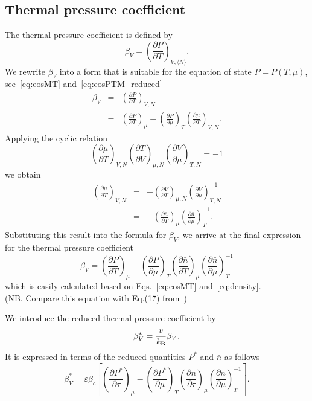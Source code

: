 \documentclass[12pt]{article}
\begin{document}
	\subsection{Thermal pressure coefficient}
	The thermal pressure coefficient is defined by
	\begin{equation}
		\label{def:therm_pres_coef}
		\beta_V = \left( \frac{\partial P}{\partial T} \right)_{V,\langle N \rangle}.
	\end{equation}
	We rewrite $\beta_V$ into a form that is suitable for the equation of state $P=P(T,\mu)$, see~\eqref{eq:eosMT} and~\eqref{eq:eosPTM_reduced}
	\begin{eqnarray}
		\beta_V & = & \left(\frac{\partial P}{\partial T}\right)_{V, N}
		\nonumber\\
		& = & \left(\frac{\partial P}{\partial T}\right)_{\mu} + \left(\frac{\partial P}{\partial \mu}\right)_T \left(\frac{\partial \mu}{\partial T}\right)_{V, N}.
	\end{eqnarray}
	Applying the cyclic relation
	\begin{equation*}
		\left(\frac{\partial \mu}{\partial T}\right)_{V, N} 
		\left(\frac{\partial T}{\partial V}\right)_{\mu, N}
		\left(\frac{\partial V}{\partial \mu}\right)_{T, N}
		= -1
	\end{equation*}
	we obtain
	\begin{eqnarray*}
		\left(\frac{\partial \mu}{\partial T}\right)_{V, N} 
		& = & 
		- \left(\frac{\partial V}{\partial T}\right)_{\mu, N} 
		\left(\frac{\partial V}{\partial \mu}\right)^{-1}_{T, N} \\
		& = & - \left(\frac{\partial \bar{n}}{\partial T}\right)_{\mu}
		\left(\frac{\partial \bar{n}}{\partial \mu}\right)^{-1}_{T}.		
	\end{eqnarray*}
	Substituting this result into the formula for $\beta_V$, we arrive at the final expression for the thermal pressure coefficient
	\begin{equation}
		\beta_V = \left(\frac{\partial P}{\partial T}\right)_{\mu} 
		- \left(\frac{\partial P}{\partial \mu}\right)_T 
		\left(\frac{\partial \bar{n}}{\partial T}\right)_{\mu}
		\left(\frac{\partial \bar{n}}{\partial \mu}\right)^{-1}_{T}
	\end{equation}
	which is easily calculated based on Eqs.~\eqref{eq:eosMT} and~\eqref{eq:density}.\\
	(NB. Compare this equation with Eq.(17) from~\cite{StrokerMeier2021})
	
	We introduce the reduced thermal pressure coefficient by
	\begin{equation}
		\beta^*_V = \frac{v}{k_{\rm B}}\beta_V.
	\end{equation}
	It is expressed in terms of the reduced quantities $P^*$ and $\bar{n}$ as follows
	\begin{equation}
		\beta^*_V = \varepsilon\beta_c 
		\left[ \left(\frac{\partial P^*}{\partial \tau}\right)_{\mu} 
		- \left(\frac{\partial P^*}{\partial \mu}\right)_T 
		\left(\frac{\partial \bar{n}}{\partial \tau}\right)_{\mu}
		\left(\frac{\partial \bar{n}}{\partial \mu}\right)^{-1}_{T} 
		\right].
	\end{equation}
	
\end{document}
